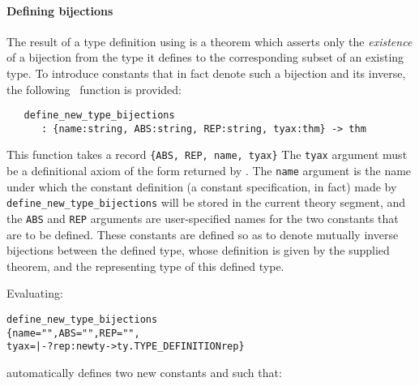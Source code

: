 \paragraph{Defining bijections}

The result of a type definition using  is a theorem
which asserts only the {\it existence\/} of a
bijection
from the type it defines to the corresponding subset of an existing type.  To
introduce constants that in fact denote such a bijection and its inverse, the
following \ML\ function is provided:

\begin{boxed}
\begin{verbatim}
   define_new_type_bijections
      : {name:string, ABS:string, REP:string, tyax:thm} -> thm
\end{verbatim}\end{boxed}

\noindent This function takes a record {\small\verb+{ABS, REP, name, tyax}+}
The {\verb+tyax+} argument must be a definitional axiom of the form returned by
.  The {\verb+name+} argument is the name under which
the constant definition (a constant specification, in fact) made by
{\small\verb!define_new_type_bijections!} will be stored in the current theory
segment, and the {\small\verb+ABS+} and {\small\verb+REP+} arguments
are user-specified names for the two constants that are to be
defined. These constants are defined so as to denote mutually inverse
bijections between the defined type, whose definition is given by the
supplied theorem, and the representing type of this defined
type.

Evaluating:

\medskip
{\def\op{{\normalsize\sl op}}
\begin{hol}\begin{alltt}
  define\_new\_type\_bijections
       \{name="", ABS="", REP="",
         tyax = |- ?rep:newty->ty. TYPE\_DEFINITION  rep \}
\end{alltt}\end{hol}}

\medskip

\noindent automatically defines two new constants
 and 
such that:

